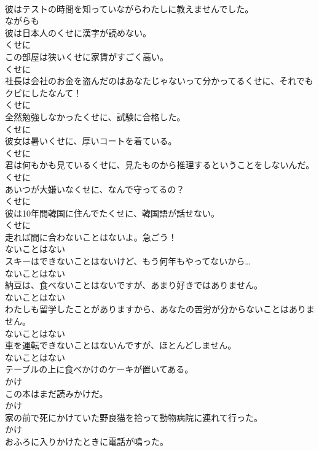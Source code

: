 \documentclass[8pt]{extreport}
\begin{document}
\begin{CJK}{UTF8}{min}
\\	彼はテストの時間を知っていながらわたしに教えませんでした。	
\\	ながらも
\\	彼は日本人のくせに漢字が読めない。	
\\	くせに
\\	この部屋は狭いくせに家賃がすごく高い。	
\\	くせに
\\	社長は会社のお金を盗んだのはあなたじゃないって分かってるくせに、それでもクビにしたなんて！	
\\	くせに
\\	全然勉強しなかったくせに、試験に合格した。	
\\	くせに
\\	彼女は暑いくせに、厚いコートを着ている。	
\\	くせに
\\	君は何もかも見ているくせに、見たものから推理するということをしないんだ。	
\\	くせに
\\	あいつが大嫌いなくせに、なんで守ってるの？	
\\	くせに
\\	彼は10年間韓国に住んでたくせに、韓国語が話せない。	
\\	くせに
\\	走れば間に合わないことはないよ。急ごう！	
\\	ないことはない
\\	スキーはできないことはないけど、もう何年もやってないから…	
\\	ないことはない
\\	納豆は、食べないことはないですが、あまり好きではありません。	
\\	ないことはない
\\	わたしも留学したことがありますから、あなたの苦労が分からないことはありません。	
\\	ないことはない
\\	車を運転できないことはないんですが、ほとんどしません。	
\\	ないことはない
\\	テーブルの上に食べかけのケーキが置いてある。	
\\	かけ
\\	この本はまだ読みかけだ。	
\\	かけ
\\	家の前で死にかけていた野良猫を拾って動物病院に連れて行った。	
\\	かけ
\\	おふろに入りかけたときに電話が鳴った。	

\end{CJK}
\end{document}
